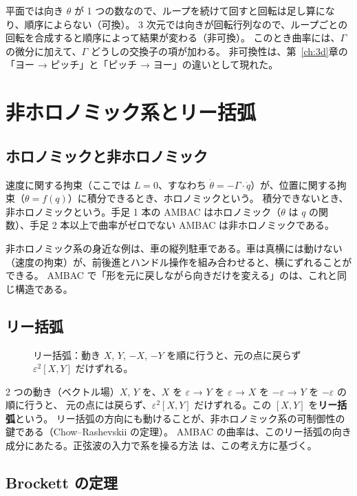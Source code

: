 平面では向き $\theta$ が 1 つの数なので、ループを続けて回すと回転は足し算になり、順序によらない（可換）。
3 次元では向きが回転行列なので、ループごとの回転を合成すると順序によって結果が変わる（非可換）。
このとき曲率には、$\Gamma$ の微分に加えて、$\Gamma$ どうしの交換子の項が加わる。
非可換性は、第~\ref{ch:3d}章の「ヨー → ピッチ」と「ピッチ → ヨー」の違いとして現れた。

\section{非ホロノミック系とリー括弧}

\subsection{ホロノミックと非ホロノミック}

速度に関する拘束（ここでは $L=0$、すなわち $\dot\theta = -\Gamma\cdot\dot q$）が、位置に関する拘束（$\theta = f(q)$）に積分できるとき、ホロノミックという。
積分できないとき、非ホロノミックという。手足 1 本の AMBAC はホロノミック（$\theta$ は $q$ の関数）、手足 2 本以上で曲率がゼロでない AMBAC は非ホロノミックである。

非ホロノミック系の身近な例は、車の縦列駐車である。車は真横には動けない（速度の拘束）が、前後進とハンドル操作を組み合わせると、横にずれることができる。
AMBAC で「形を元に戻しながら向きだけを変える」のは、これと同じ構造である。

\subsection{リー括弧}

\begin{figure}[htbp]\centering
\resizebox{0.75\linewidth}{!}{}
\caption{リー括弧：動き $X$, $Y$, $-X$, $-Y$ を順に行うと、元の点に戻らず $\varepsilon^2[X,Y]$ だけずれる。}\label{fig:tikz-liebracket}
\end{figure}

2 つの動き（ベクトル場）$X$, $Y$ を、$X$ を $\varepsilon$ → $Y$ を $\varepsilon$ → $X$ を $-\varepsilon$ → $Y$ を $-\varepsilon$ の順に行うと、
元の点には戻らず、$\varepsilon^2[X,Y]$ だけずれる。この $[X,Y]$ を\textbf{リー括弧}という。
リー括弧の方向にも動けることが、非ホロノミック系の可制御性の鍵である（Chow--Rashevskii の定理）。
AMBAC の曲率は、このリー括弧の向き成分にあたる。正弦波の入力で系を操る方法 \cite{R10} は、この考え方に基づく。

\subsection{Brockett の定理}

